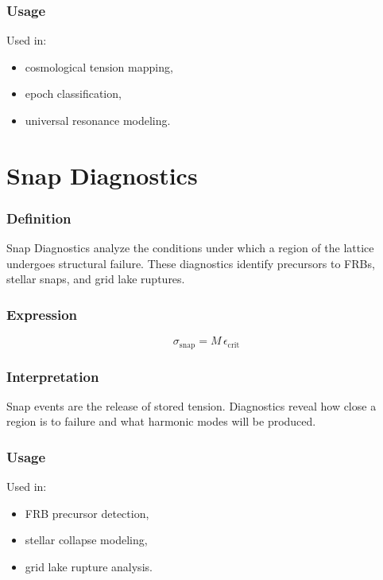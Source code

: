 \documentclass[12pt,oneside]{book}
\begin{document}
\subsubsection{Usage}
Used in:
\begin{itemize}
    \item cosmological tension mapping,
    \item epoch classification,
    \item universal resonance modeling.
\end{itemize}


\section{Snap Diagnostics}

\subsubsection{Definition}
Snap Diagnostics analyze the conditions under which a region of the lattice undergoes structural
failure. These diagnostics identify precursors to FRBs, stellar snaps, and grid lake ruptures.

\subsubsection{Expression}


\[
\sigma_{\mathrm{snap}} = M \, \epsilon_{\mathrm{crit}}
\]



\subsubsection{Interpretation}
Snap events are the release of stored tension.  
Diagnostics reveal how close a region is to failure and what harmonic modes will be produced.

\subsubsection{Usage}
Used in:
\begin{itemize}
    \item FRB precursor detection,
    \item stellar collapse modeling,
    \item grid lake rupture analysis.
\end{itemize}
\end{document}
